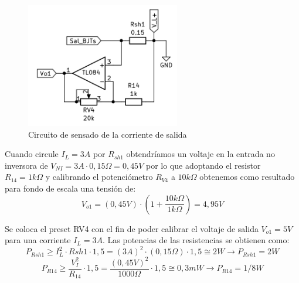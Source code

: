\begin{figure} [H]
	\centering
	\includegraphics[width=0.6\textwidth]{./imagenes/Sensor_corriente.png}
	\caption{Circuito de sensado de la corriente de salida}
	\label{F:Sensor_corriente}
\end{figure} \par 

Cuando circule $I_L =3A$ por $R_{sh1}$ obtendríamos un voltaje en la entrada no inversora de $V_{NI} =3A\cdot 0,15\Omega =0,45V$ por lo que adoptando el resistor $R_{14} =1k\Omega$ y calibrando el potenciómetro $R_{V4} $ a $10k\Omega$ obtenemos como resultado para fondo de escala una tensión de:
\begin{equation}
V_{o1} =(0,45V)\cdot (1+\frac{10k\Omega }{1k\Omega })=4,95V
\end{equation} \par 

Se coloca el preset RV4 con el fin de poder calibrar el voltaje de salida $V_{o1}=5V$ para una corriente $I_L=3A$. Las potencias de las resistencias se obtienen como:
\begin{equation}
P_{Rsh1}\geq I_L^2\cdot Rsh1\cdot 1,5=(3 A)^2\cdot (0,15 \Omega)\cdot 1,5\cong 2 W \to P_{Rsh1}=2W
\end{equation}
\begin{equation}
P_{R14}\geq \frac{V_I^2}{R_{14}}\cdot 1,5=\frac{(0,45 V)^2}{1000\Omega}\cdot 1,5 \cong 0,3 mW \to P_{R14}=1/8W
\end{equation} \par

